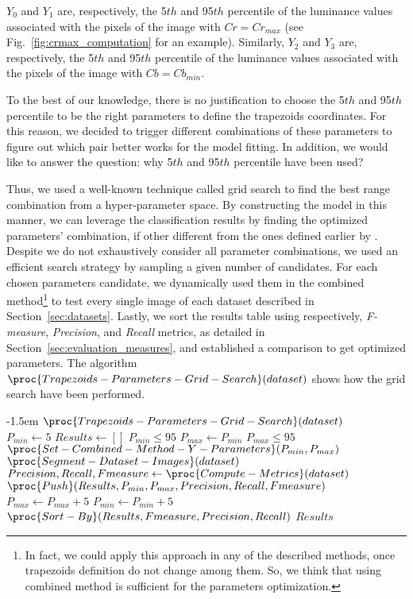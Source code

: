$Y_0$ and $Y_1$ are, respectively, the 5${th}$ and 95$th$ percentile of the luminance values associated with the pixels of the image with $Cr = Cr_{max}$ (see Fig.~\ref{fig:crmax_computation} for an example). Similarly, $Y_2$ and $Y_3$ are, respectively, the 5${th}$ and 95$th$ percentile of the luminance values associated with the pixels of the image with $Cb = Cb_{min}$.

To the best of our knowledge, there is no justification to choose the 5${th}$ and 95$th$ percentile to be the right parameters to define the trapezoids coordinates. For this reason, we decided to trigger different combinations of these parameters to figure out which pair better works for the model fitting. In addition, we would like to answer the question: why 5${th}$ and 95$th$ percentile have been used?

Thus, we used a well-known technique called grid search to find the best range combination from a hyper-parameter space. By constructing the model in this manner, we can leverage the classification results by finding the optimized parameters' combination, if other different from the ones defined earlier by \citet{brancati:17}. Despite we do not exhaustively consider all parameter combinations, we used an efficient search strategy by sampling a given number of candidates. For each chosen parameters candidate, we dynamically used them in the combined method\footnote{In fact, we could apply this approach in any of the described methods, once trapezoids definition do not change among them. So, we think that using combined method is sufficient for the parameters optimization.} to test every single image of each dataset described in Section~\ref{sec:datasets}. Lastly, we sort the results table using respectively, \emph{F-measure}, \emph{Precision}, and \emph{Recall} metrics, as detailed in Section~\ref{sec:evaluation_measures}, and established a comparison to get optimized parameters. The algorithm $\proc{Trapezoids-Parameters-Grid-Search}(dataset)$ shows how the grid search have been performed.

\begin{codebox}
\kern-1.5em $\proc{Trapezoids-Parameters-Grid-Search}(dataset)$\\
\li $P_{min} \gets 5$
\li $Results \gets []$
\li
\li \While $P_{min} \leq 95$
\li \Do
        $P_{max} \gets P_{min}$
\li     \While $P_{max} \leq 95$
\li     \Do
            $\proc{Set-Combined-Method-Y-Parameters}(P_{min}, P_{max})$ \label{alg:tpgs-set-cmb-y}
\li         $\proc{Segment-Dataset-Images}(dataset)$    \label{alg:tpgs-segment-dtset}
\li         $Precision, Recall, Fmeasure \gets \proc{Compute-Metrics}(dataset)$ \label{alg:tpgs-compt-metrcs}
\li         $\proc{Push}(Results, P_{min}, P_{max}, Precision, Recall, Fmeasure)$ \label{alg:tpgs-push-rslts}
\li\li      $P_{max} \gets P_{max} + 5$
        \End
\li      $P_{min} \gets P_{min} + 5$
    \End
\li
\li $\proc{Sort-By}(Results, Fmeasure, Precision, Recall)$
\li \Return $Results$
\end{codebox}


